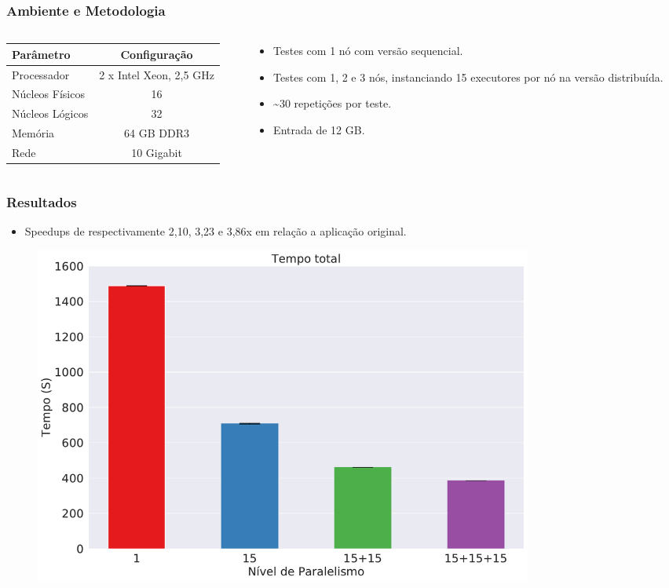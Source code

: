 \documentclass{beamer}
\begin{document}
\begin{frame}
 \frametitle{Ambiente e Metodologia}
 \begin{columns}[T] %
  \begin{column}{.55\textwidth}
 \begin{table}[H]
  \centering
  \small
  \begin{tabular}{l c} \toprule
  \textbf{Parâmetro}  &  \textbf{Configuração} \\ 
  \midrule
  Processador     & 2 x Intel Xeon, 2,5 GHz\\
  Núcleos Físicos    & 16  \\
  Núcleos Lógicos   & 32   \\
  Memória       & 64 GB DDR3  \\
  Rede	      &  10 Gigabit \\
  \bottomrule
  \end{tabular}
  \end{table}
  \end{column}%
  \hfill%
  \begin{column}{.41\textwidth}
  \begin{itemize}
   \item Testes com 1 nó com versão sequencial.
   \item Testes com 1, 2 e 3 nós, instanciando 15 executores por nó na versão 
distribuída.
   \item \textasciitilde30 repetições por teste.
   \item Entrada de 12 GB.
  \end{itemize}
  \end{column}%
  \end{columns}
\end{frame}


\begin{frame}
 \frametitle{Resultados}
 \begin{itemize}
  \item Speedups de respectivamente 2,10, 3,23 e 3,86x em relação a aplicação 
original.
 \end{itemize}
 \begin{figure}[ht]
  \centerline{
  \includegraphics[width=0.8\textwidth]{./img/total.pdf}}
  \label{fig:total_full}
  \end{figure}
\end{frame}
\end{document}
